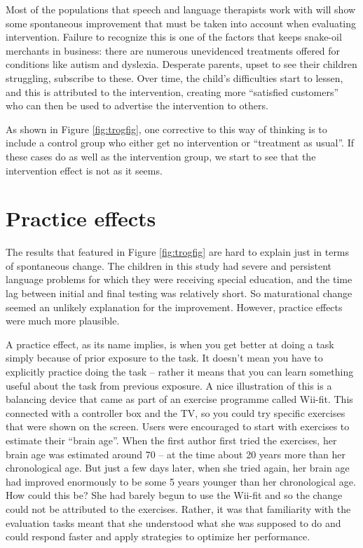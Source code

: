 \documentclass{krantz}
\begin{document}
Most of the populations that speech and language therapists work with will show some spontaneous improvement that must be taken into account when evaluating intervention. Failure to recognize this is one of the factors that keeps snake-oil merchants in business: there are numerous unevidenced treatments offered for conditions like autism and dyslexia. Desperate parents, upset to see their children struggling, subscribe to these. Over time, the child's difficulties start to lessen, and this is attributed to the intervention, creating more ``satisfied customers'' who can then be used to advertise the intervention to others.

As shown in Figure \ref{fig:trogfig}, one corrective to this way of thinking is to include a control group who either get no intervention or ``treatment as usual''. If these cases do as well as the intervention group, we start to see that the intervention effect is not as it seems.

\hypertarget{practice-effects-1}{%
\section{Practice effects}\label{practice-effects-1}}

The results that featured in Figure \ref{fig:trogfig} are hard to explain just in terms of spontaneous change. The children in this study had severe and persistent language problems for which they were receiving special education, and the time lag between initial and final testing was relatively short. So maturational change seemed an unlikely explanation for the improvement. However, practice effects were much more plausible.

A practice effect, as its name implies, is when you get better at doing a task simply because of prior exposure to the task. It doesn't mean you have to explicitly practice doing the task -- rather it means that you can learn something useful about the task from previous exposure. A nice illustration of this is a balancing device that came as part of an exercise programme called Wii-fit. This connected with a controller box and the TV, so you could try specific exercises that were shown on the screen. Users were encouraged to start with exercises to estimate their ``brain age''. When the first author first tried the exercises, her brain age was estimated around 70 -- at the time about 20 years more than her chronological age. But just a few days later, when she tried again, her brain age had improved enormously to be some 5 years younger than her chronological age. How could this be? She had barely begun to use the Wii-fit and so the change could not be attributed to the exercises. Rather, it was that familiarity with the evaluation tasks meant that she understood what she was supposed to do and could respond faster and apply strategies to optimize her performance.
\end{document}
